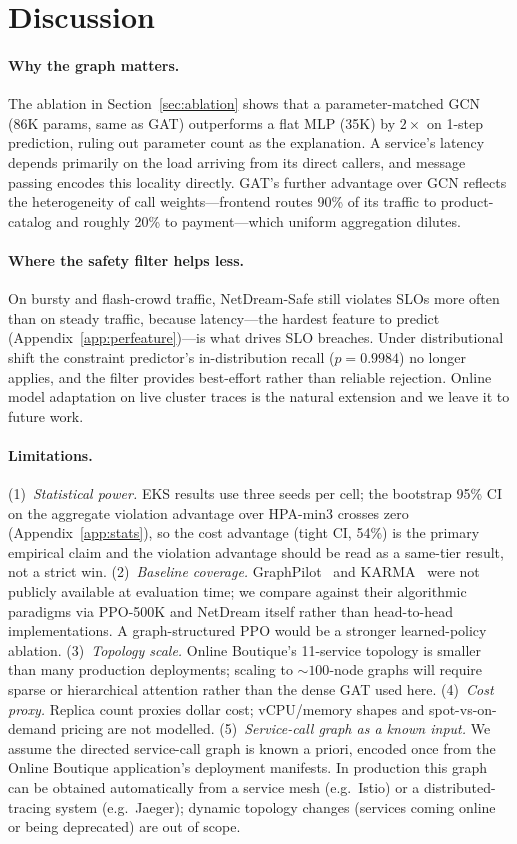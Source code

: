 \section{Discussion}
\label{sec:discussion}

\paragraph{Why the graph matters.}
The ablation in Section~\ref{sec:ablation} shows that a parameter-matched
GCN (86K params, same as GAT) outperforms a flat MLP (35K) by $2\times$
on 1-step prediction, ruling out parameter count as the explanation.
A service's latency depends primarily on the load arriving from its
direct callers, and message passing encodes this locality directly.
GAT's further advantage over GCN reflects the heterogeneity of call
weights---frontend routes 90\% of its traffic to product-catalog and
roughly 20\% to payment---which uniform aggregation dilutes.

\paragraph{Where the safety filter helps less.}
On bursty and flash-crowd traffic, NetDream-Safe still violates SLOs
more often than on steady traffic, because latency---the hardest
feature to predict (Appendix~\ref{app:perfeature})---is what drives
SLO breaches. Under distributional shift the constraint predictor's
in-distribution recall ($p=0.9984$) no longer applies, and the filter
provides best-effort rather than reliable rejection. Online model
adaptation on live cluster traces is the natural extension and we
leave it to future work.

\paragraph{Limitations.}
(1)~\emph{Statistical power.} EKS results use three seeds per cell;
the bootstrap 95\% CI on the aggregate violation advantage over
HPA-min3 crosses zero (Appendix~\ref{app:stats}), so the cost
advantage (tight CI, 54\%) is the primary empirical claim and the
violation advantage should be read as a same-tier result, not a
strict win.
(2)~\emph{Baseline coverage.} GraphPilot~\citep{chen2025graphpilot}
and KARMA~\citep{karma2025} were not publicly available at evaluation
time; we compare against their algorithmic paradigms via PPO-500K and
NetDream itself rather than head-to-head implementations. A
graph-structured PPO would be a stronger learned-policy ablation.
(3)~\emph{Topology scale.} Online Boutique's 11-service topology is
smaller than many production deployments; scaling to ${\sim}100$-node
graphs will require sparse or hierarchical attention rather than the
dense GAT used here.
(4)~\emph{Cost proxy.} Replica count proxies dollar cost; vCPU/memory
shapes and spot-vs-on-demand pricing are not modelled.
(5)~\emph{Service-call graph as a known input.} We assume the directed
service-call graph is known a priori, encoded once from the Online
Boutique application's deployment manifests. In production this graph
can be obtained automatically from a service mesh (e.g.\ Istio) or a
distributed-tracing system (e.g.\ Jaeger); dynamic topology changes
(services coming online or being deprecated) are out of scope.
